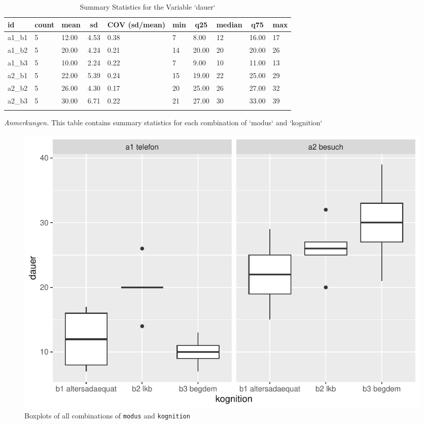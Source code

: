 \documentclass[
  doc,floatsintext]{apa6}
\begin{document}
\begin{table}[tbp]

\begin{center}
\begin{threeparttable}

\caption{\label{tab:tabsummary}Summary Statistics for the Variable `dauer`}

\begin{tabular}{llllllllll}
\toprule
id & \multicolumn{1}{c}{count} & \multicolumn{1}{c}{mean} & \multicolumn{1}{c}{sd} & \multicolumn{1}{c}{COV (sd/mean)} & \multicolumn{1}{c}{min} & \multicolumn{1}{c}{q25} & \multicolumn{1}{c}{median} & \multicolumn{1}{c}{q75} & \multicolumn{1}{c}{max}\\
\midrule
a1\_b1 & 5 & 12.00 & 4.53 & 0.38 & 7 & 8.00 & 12 & 16.00 & 17\\
a1\_b2 & 5 & 20.00 & 4.24 & 0.21 & 14 & 20.00 & 20 & 20.00 & 26\\
a1\_b3 & 5 & 10.00 & 2.24 & 0.22 & 7 & 9.00 & 10 & 11.00 & 13\\
a2\_b1 & 5 & 22.00 & 5.39 & 0.24 & 15 & 19.00 & 22 & 25.00 & 29\\
a2\_b2 & 5 & 26.00 & 4.30 & 0.17 & 20 & 25.00 & 26 & 27.00 & 32\\
a2\_b3 & 5 & 30.00 & 6.71 & 0.22 & 21 & 27.00 & 30 & 33.00 & 39\\
\bottomrule
\addlinespace
\end{tabular}

\begin{tablenotes}[para]
\normalsize{\textit{Anmerkungen.} This table contains summary statistics for each combination of `modus` and `kognition`}
\end{tablenotes}

\end{threeparttable}
\end{center}

\end{table}

\begin{figure}
\centering
\includegraphics{desc_aov_files/figure-latex/aboxplot-1.pdf}
\caption{\label{fig:aboxplot}Boxplots of all combinations of \texttt{modus} and \texttt{kognition}}
\end{figure}
\end{document}
